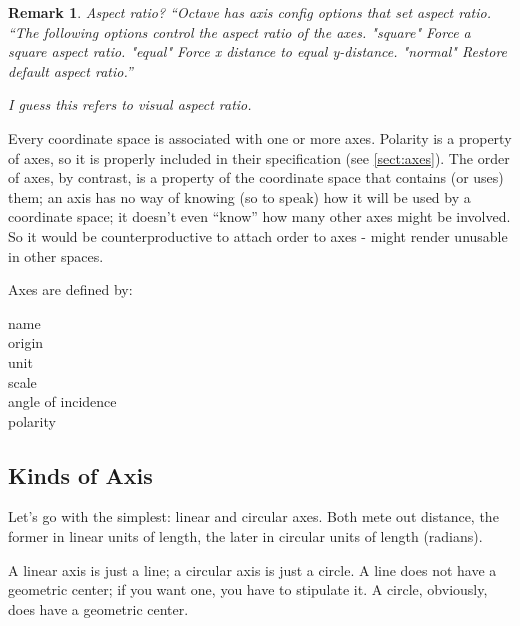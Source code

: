 \documentclass[12pt]{tufte-handout}
\numberwithin{equation}{subsection}
\numberwithin{equation}{subsection}
\newtheorem{remark}{Remark}
\newcommand\cspace{coordinate space}
\begin{document}
{  \begin{remark}
    Aspect ratio?  ``Octave has axis config options that set aspect
    ratio.  ``The following options control the aspect ratio of the
    axes.  "square" Force a square aspect ratio.  "equal" Force x
    distance to equal y-distance.  "normal" Restore default aspect
    ratio.''

    I guess this refers to visual aspect ratio.
  \end{remark}

  Every \cspace{} is associated with one or more axes.  Polarity is a
  property of axes, so it is properly included in their specification
  (see \ref{sect:axes}).  The order of axes, by contrast, is a
  property of the \cspace{} that contains (or uses) them; an axis has
  no way of knowing (so to speak) how it will be used by a \cspace; it
  doesn't even ``know'' how many other axes might be involved.  So it
  would be counterproductive to attach order to axes - might render
  unusable in other spaces.

  Axes are defined by:

  \begin{description}
  \item [name]
  \item [origin]
  \item [unit]
  \item [scale]
  \item [angle of incidence]
  \item [polarity]
  \end{description}

  \subsection{Kinds of Axis}

  Let's go with the simplest: linear and circular axes.  Both mete
  out distance, the former in linear units of length, the later in
  circular units of length (radians).

  A linear axis is just a line; a circular axis is just a circle.  A
  line does not have a geometric center; if you want one, you have
  to stipulate it.  A circle, obviously, does have a geometric
  center.

}
\end{document}
